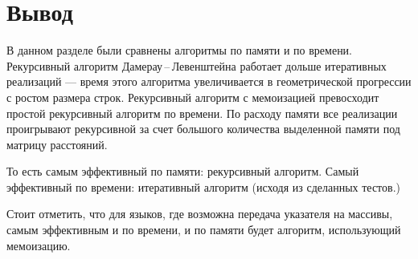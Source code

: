 \section{Вывод}
В данном разделе были сравнены алгоритмы по памяти и по времени.
Рекурсивный алгоритм  Дамерау\,--\,Левенштейна работает дольше итеративных реализаций --- время этого алгоритма увеличивается в геометрической прогрессии с ростом размера строк.
Рекурсивный алгоритм с мемоизацией превосходит простой рекурсивный алгоритм по времени. 
По расходу памяти все реализации проигрывают рекурсивной за счет большого количества выделенной памяти под матрицу расстояний. 

То есть самым эффективный по памяти: рекурсивный алгоритм.
Самый эффективный по времени: итеративный алгоритм (исходя из сделанных тестов.)  

Стоит отметить, что для языков, где возможна передача указателя на массивы, самым эффективным и по времени, и по памяти будет алгоритм, использующий мемоизацию.